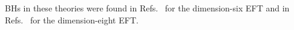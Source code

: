 \documentclass[twocolumn,prd,aps,superscriptaddress,preprintnumbers,tightenlines,showpacs,nofootinbib,eqsecnum,amsfonts,amsmath,longbibliography]{revtex4-1}
\newcommand{\lame}{\lambda_{\rm e}}
\newcommand{\lamo}{\lambda_{\rm o}}
\begin{document}
BHs in these theories were found in Refs.~\cite{deRham:2020ejn,Cano:2020cao} for the dimension-six EFT
and in Refs.~\cite{Cardoso:2018ptl} for the dimension-eight EFT.


%
%
\end{document}
